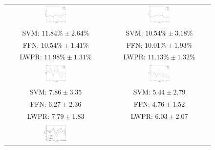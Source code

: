 \begin{figure}[!ht] \centering
  \begin{tabular}{cc}
    \includegraphics[width=0.25\textwidth]{figs/fig_err_regr_resCrossBestOnDay1.png} &
    \includegraphics[width=0.25\textwidth]{figs/fig_err_regr_resCrossBestOnDay2.png} \\
     SVM: $11.84\% \pm 2.64\%$ &  SVM: $10.54\% \pm 3.18\%$ \\
     FFN: $10.54\% \pm 1.41\%$ &  FFN: $10.01\% \pm 1.93\%$ \\
    LWPR: $11.98\% \pm 1.31\%$ & LWPR: $11.13\% \pm 1.32\%$ \\
    \includegraphics[width=0.25\textwidth]{figs/fig_MSE_regr_resCrossBestOnDay1.png} &
    \includegraphics[width=0.25\textwidth]{figs/fig_MSE_regr_resCrossBestOnDay2.png} \\
     SVM: $7.86 \pm 3.35$ &  SVM: $5.44 \pm 2.79$ \\
     FFN: $6.27 \pm 2.36$ &  FFN: $4.76 \pm 1.52$ \\
    LWPR: $7.79 \pm 1.83$ & LWPR: $6.03 \pm 2.07$ \\
    \includegraphics[width=0.25\textwidth]{figs/fig_SCC_regr_resCrossBestOnDay1.png} &

\end{tabular}
\end{figure}
